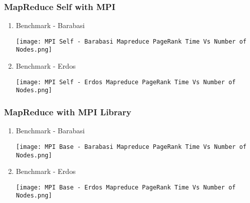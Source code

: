 \documentclass{article}
\begin{document}
    \clearpage
    
    \subsubsection{MapReduce Self with MPI}
    \begin{enumerate}
        \item Benchmark - Barabasi
        \begin{center}
            \texttt{[image: MPI Self - Barabasi Mapreduce PageRank Time Vs Number of Nodes.png]}
        \end{center}
            
        
        \item Benchmark - Erdos
        \begin{center}
            \texttt{[image: MPI Self - Erdos Mapreduce PageRank Time Vs Number of Nodes.png]}
        \end{center}
    \end{enumerate}
    
    \clearpage
    
    \subsubsection{MapReduce with MPI Library}
    
    \begin{enumerate}
        \item Benchmark - Barabasi
        \begin{center}
            \texttt{[image: MPI Base - Barabasi Mapreduce PageRank Time Vs Number of Nodes.png]}
        \end{center}
            
        
        \item Benchmark - Erdos
        \begin{center}
            \texttt{[image: MPI Base - Erdos Mapreduce PageRank Time Vs Number of Nodes.png]}
        \end{center}
    \end{enumerate}
    
    \clearpage
    
\end{document}

